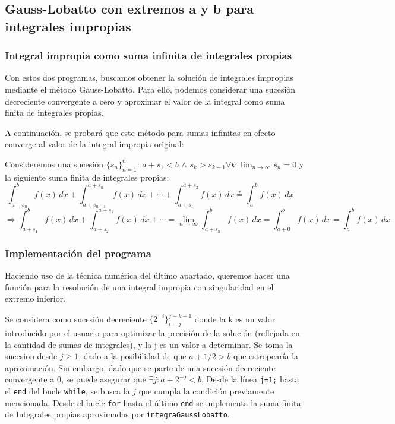 \documentclass[a4paper]{article}
\begin{document}
\subsection{Gauss-Lobatto con extremos a y b para integrales impropias}

\subsubsection{Integral impropia como suma infinita de integrales propias}
Con estos dos programas, buscamos obtener la solución de integrales impropias mediante el método Gauss-Lobatto. Para ello,  podemos considerar una sucesión decreciente convergente a cero y aproximar el valor de la integral como suma
 finita de integrales propias.
 
A continuación, se probará que este método para sumas infinitas en efecto converge al valor de la integral impropia original:

Consideremos una sucesión $\{s_n\}_{n=1}^n$: $a+s_1<b$ $\wedge$ \stackrel{*} $s_k > s_{k-1} \forall k$ \wedge $\lim_{n \rightarrow \infty} s_n = 0$
y la siguiente suma finita de integrales propias:
$$
\int_{a + s_n}^b f(x) \, dx + \int_{a + s_{n-1}}^{a + s_n} f(x) \, dx + \cdots + \int_{a + s_1}^{a + s_2} f(x) \, dx \stackrel{*}= \int_a^b f(x) \, dx \quad $$
$$\Rightarrow \int_{a + s_1}^b f(x) \, dx + \int_{a + s_2}^{a + s_1} f(x) \, dx + \cdots = \lim_{n \rightarrow \infty} \int_{a + s_n}^b f(x) \, dx = \int_{a + 0}^b f(x) \, dx = \int_a^b f(x) \, dx$$

\subsubsection{Implementación del programa}

Haciendo uso de la técnica numérica del último apartado, queremos hacer una función para la resolución de una integral impropia con singularidad en el extremo inferior.

Se considera como sucesión decreciente $\{2^{-i}\}_{i=j}^{j+k-1}$ donde la k es un valor introducido por el usuario para optimizar la precisión de la solución (reflejada en la cantidad de sumas de integrales), y la j es un valor a determinar. Se toma la sucesion desde $j\geq 1$, dado a la posibilidad de que $a+1/2>b$ que estropearía la aproximación. Sin embargo, dado que se parte de una sucesión decreciente convergente a 0, se puede asegurar que $\exists j:a+2^{-j}<b$. Desde la línea \texttt{j=1;} hasta el \texttt{end} del bucle \texttt{while}, se busca la $j$ que cumpla la condición previamente mencionada. Desde el bucle \texttt{for} hasta el último \texttt{end} se implementa la suma finita de Integrales propias aproximadas por \texttt{integraGaussLobatto}.
\end{document}
